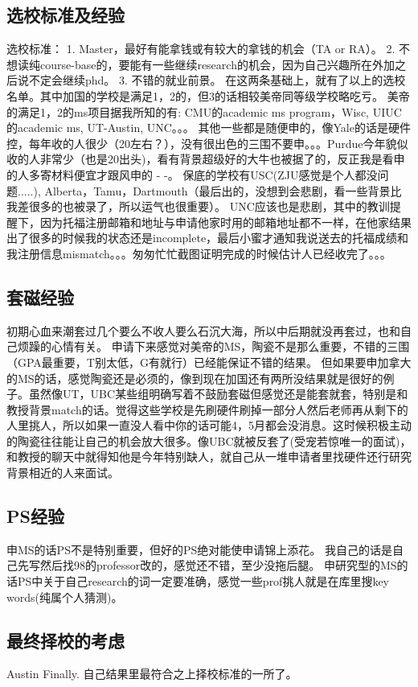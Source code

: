 \documentclass[11pt,fleqn,openany]{book} %
\begin{document}
\subsection*{选校标准及经验}
选校标准：
1. Master，最好有能拿钱或有较大的拿钱的机会（TA or RA）。
2. 不想读纯course-base的，要能有一些继续research的机会，因为自己兴趣所在外加之后说不定会继续phd。
3. 不错的就业前景。
在这两条基础上，就有了以上的选校名单。其中加国的学校是满足1，2的，但3的话相较美帝同等级学校略吃亏。
美帝的满足1，2的ms项目据我所知的有: CMU的academic ms program，Wisc, UIUC的academic ms, UT-Austin, UNC。。。
其他一些都是随便申的，像Yale的话是硬件控，每年收的人很少（20左右？），没有很出色的三围不要申。。。Purdue今年貌似收的人非常少（也是20出头)，看有背景超级好的大牛也被据了的，反正我是看申的人多寄材料便宜才跟风申的 - -。
保底的学校有USC(ZJU感觉是个人都没问题.....), Alberta，Tamu，Dartmouth（最后出的，没想到会悲剧，看一些背景比我差很多的也被录了，所以运气也很重要）。
UNC应该也是悲剧，其中的教训提醒下，因为托福注册邮箱和地址与申请他家时用的邮箱地址都不一样，在他家结果出了很多的时候我的状态还是incomplete，最后小蜜才通知我说送去的托福成绩和我注册信息mismatch。。。匆匆忙忙截图证明完成的时候估计人已经收完了。。。
\subsection*{套磁经验}
初期心血来潮套过几个要么不收人要么石沉大海，所以中后期就没再套过，也和自己烦躁的心情有关。
申请下来感觉对美帝的MS，陶瓷不是那么重要，不错的三围（GPA最重要，T别太低，G有就行）已经能保证不错的结果。
但如果要申加拿大的MS的话，感觉陶瓷还是必须的，像到现在加国还有两所没结果就是很好的例子。虽然像UT，UBC某些组明确写着不鼓励套磁但感觉还是能套就套，特别是和教授背景match的话。觉得这些学校是先刷硬件刷掉一部分人然后老师再从剩下的人里挑人，所以如果一直没人看中你的话可能4，5月都会没消息。这时候积极主动的陶瓷往往能让自己的机会放大很多。像UBC就被反套了(受宠若惊唯一的面试)，和教授的聊天中就得知他是今年特别缺人，就自己从一堆申请者里找硬件还行研究背景相近的人来面试。
\subsection*{PS经验}
申MS的话PS不是特别重要，但好的PS绝对能使申请锦上添花。
我自己的话是自己先写然后找98的professor改的，感觉还不错，至少没拖后腿。
申研究型的MS的话PS中关于自己research的词一定要准确，感觉一些prof挑人就是在库里搜key words(纯属个人猜测)。
\subsection*{最终择校的考虑}
Austin Finally. 自己结果里最符合之上择校标准的一所了。
\end{document}
